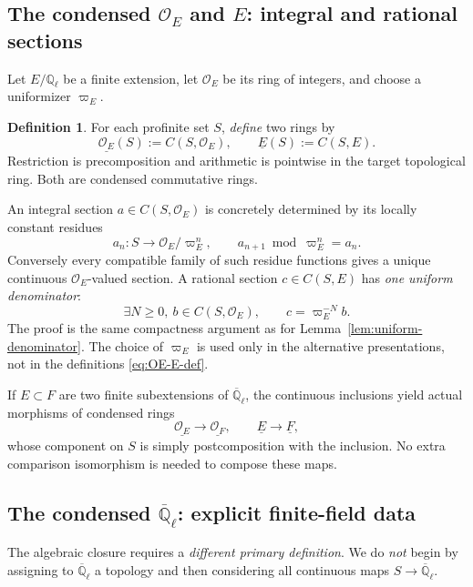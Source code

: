 \documentclass[11pt,a4paper]{article}
\numberwithin{equation}{section}
\theoremstyle{definition}
\newtheorem{definition}[theorem]{Definition}
\theoremstyle{remark}
\newcommand{\OO}{\mathcal O}
\newcommand{\ringunder}[1]{\underline{#1}}
\newcommand{\Qlbar}{\overline{\mathbb Q}_{\ell}}
\begin{document}
\subsection{\texorpdfstring{The condensed $\OO_E$ and $E$}{The condensed OE and E}: integral and rational sections}

Let $E/\mathbb Q_\ell$ be a finite extension, let $\OO_E$ be its ring
of integers, and choose a uniformizer $\varpi_E$.

\begin{definition}\label{def:OE-E}
For each profinite set $S$, \emph{define} two rings by
\begin{equation}\label{eq:OE-E-def}
  \boxed{\quad
   \ringunder{\OO_E}(S):=C(S,\OO_E),\qquad
   \ringunder E(S):=C(S,E).
  \quad}
\end{equation}
Restriction is precomposition and arithmetic is pointwise in the
target topological ring.  Both are condensed commutative rings.
\end{definition}

An integral section $a\in C(S,\OO_E)$ is concretely determined by its
locally constant residues
\[
 a_n:S\to\OO_E/\varpi_E^n,\qquad
 a_{n+1}\bmod\varpi_E^n=a_n.
\]
Conversely every compatible family of such residue functions gives a
unique continuous $\OO_E$-valued section.  A rational section
$c\in C(S,E)$ has \emph{one uniform denominator}:
\[
 \exists N\geq0,\ b\in C(S,\OO_E),\qquad c=\varpi_E^{-N}b.
\]
The proof is the same compactness argument as for
Lemma~\ref{lem:uniform-denominator}.  The choice of $\varpi_E$ is
used only in the alternative presentations, not in the definitions
\eqref{eq:OE-E-def}.

If $E\subset F$ are two finite subextensions of $\Qlbar$, the
continuous inclusions yield actual morphisms of condensed rings
\begin{equation}\label{eq:finite-transitions}
 \ringunder{\OO_E}\longrightarrow\ringunder{\OO_F},\qquad
 \ringunder E\longrightarrow\ringunder F,
\end{equation}
whose component on $S$ is simply postcomposition with the inclusion.
No extra comparison isomorphism is needed to compose these maps.

\subsection{\texorpdfstring{The condensed $\overline{\mathbb Q}_\ell$}{The condensed Qbarl}: explicit finite-field data}

The algebraic closure requires a \emph{different primary definition}.
We do \emph{not} begin by assigning to $\Qlbar$ a topology and then
considering all continuous maps $S\to\Qlbar$.
\end{document}
